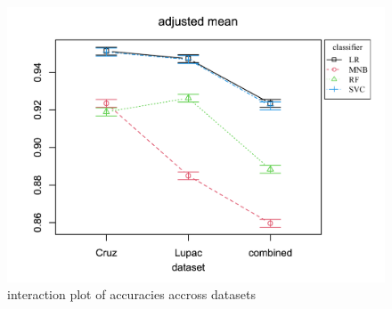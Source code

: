 \begin{figure}[h!]
    \centering
    \includegraphics[width=\textwidth,height=\textheight, keepaspectratio]{figures/stats/im.png}
        \caption{interaction plot of accuracies accross datasets}
        \label{fig:interaction_plot}
\end{figure}






